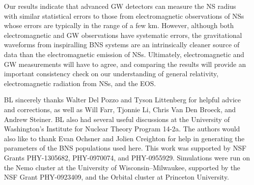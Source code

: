 \documentclass[twocolumn,prd,amssymb,aps,nofootinbib,showpacs,epsf]{revtex4}
\begin{document}
Our results indicate that advanced GW detectors can measure the NS radius with similar statistical errors to those from electromagnetic observations of NSs whose errors are typically in the range of a few km. However, although both electromagnetic and GW observations have systematic errors, the gravitational waveforms from inspiralling BNS systems are an intrinsically cleaner source of data than the electromagnetic emission of NSs. Ultimately, electromagnetic and GW measurements will have to agree, and comparing the results will provide an important consistency check on our understanding of general relativity, electromagnetic radiation from NSs, and the EOS.
 
\acknowledgements

BL sincerely thanks Walter Del Pozzo and Tyson Littenberg for helpful advice and corrections, as well as Will Farr, Tjonnie Li, Chris Van Den Broeck, and Andrew Steiner. BL also had several useful discussions at the University of Washington's Institute for Nuclear Theory Program 14-2a. The authors would also like to thank Evan Ochsner and Jolien Creighton for help in generating the parameters of the BNS populations used here. This work was supported by NSF Grants PHY-1305682, PHY-0970074, and PHY-0955929. Simulations were run on the Nemo cluster at the University of Wisconsin--Milwaukee, supported by the NSF Grant PHY-0923409, and the Orbital cluster at Princeton University.


\end{document}

